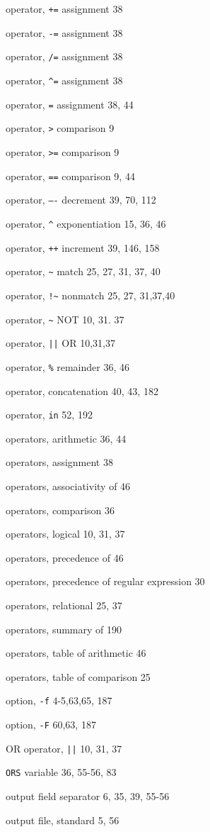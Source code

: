 \begin{multicols}{3}
operator, \verb'+=' assignment 38

operator, \verb'-=' assignment 38

operator, \verb'/=' assignment 38

operator, \verb'^=' assignment 38

operator, \verb'=' assignment 38, 44

operator, \verb'>' comparison 9

operator, \verb'>=' comparison 9

operator, \verb'==' comparison 9, 44

operator, \verb'—-' decrement 39, 70, 112

operator, \verb'^' exponentiation 15, 36, 46

operator, \verb'++' increment 39, 146, 158

operator, \verb'~' match 25, 27, 31, 37, 40

operator, \verb'!~' nonmatch 25, 27, 31,37,40

operator, \verb'~' NOT 10, 31. 37

operator, \verb'||' OR 10,31,37

operator, \verb'%' remainder 36, 46

operator, concatenation 40, 43,  182

operator, \verb'in' 52, 192

operators, arithmetic 36, 44

operators, assignment 38

operators, associativity of 46

operators, comparison 36

operators, logical 10, 31, 37

operators, precedence of 46

operators, precedence of regular expression 30

operators, relational 25, 37

operators, summary of 190

operators, table of arithmetic 46

operators, table of comparison 25

option, \verb'-f' 4-5,63,65, 187

option, \verb'-F' 60,63, 187

OR operator, \verb'||' 10, 31, 37

\verb'ORS' variable 36, 55-56, 83

output field separator 6, 35, 39, 55-56

output file, standard 5, 56


\end{multicols}
